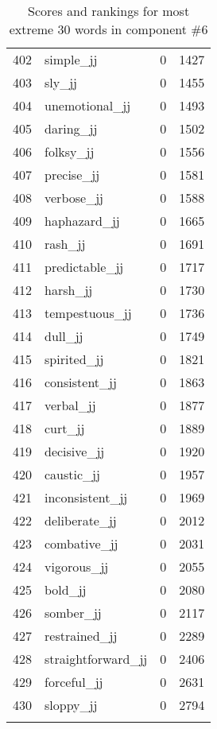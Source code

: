 \begin{longtable}[!htbp]{| rlr@{.}l |}
    402 & simple\_jj & 0 & 1427 \\
    403 & sly\_jj & 0 & 1455 \\
    404 & unemotional\_jj & 0 & 1493 \\
    405 & daring\_jj & 0 & 1502 \\
    406 & folksy\_jj & 0 & 1556 \\
    407 & precise\_jj & 0 & 1581 \\
    408 & verbose\_jj & 0 & 1588 \\
    409 & haphazard\_jj & 0 & 1665 \\
    410 & rash\_jj & 0 & 1691 \\
    411 & predictable\_jj & 0 & 1717 \\
    412 & harsh\_jj & 0 & 1730 \\
    413 & tempestuous\_jj & 0 & 1736 \\
    414 & dull\_jj & 0 & 1749 \\
    415 & spirited\_jj & 0 & 1821 \\
    416 & consistent\_jj & 0 & 1863 \\
    417 & verbal\_jj & 0 & 1877 \\
    418 & curt\_jj & 0 & 1889 \\
    419 & decisive\_jj & 0 & 1920 \\
    420 & caustic\_jj & 0 & 1957 \\
    421 & inconsistent\_jj & 0 & 1969 \\
    422 & deliberate\_jj & 0 & 2012 \\
    423 & combative\_jj & 0 & 2031 \\
    424 & vigorous\_jj & 0 & 2055 \\
    425 & bold\_jj & 0 & 2080 \\
    426 & somber\_jj & 0 & 2117 \\
    427 & restrained\_jj & 0 & 2289 \\
    428 & straightforward\_jj & 0 & 2406 \\
    429 & forceful\_jj & 0 & 2631 \\
    430 & sloppy\_jj & 0 & 2794 \\
    \hline
    \caption{Scores and rankings for most extreme 30 words in component \#6} \\
\end{longtable}
